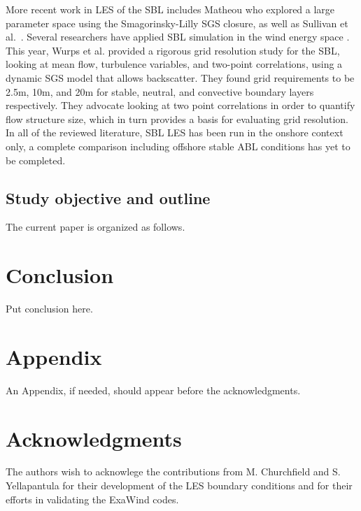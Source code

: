 \documentclass[conf]{new-aiaa}
\begin{document}
More recent work in LES of the SBL includes Matheou \cite{Matheou2016} who 
explored a large parameter space using the Smagorinsky-Lilly SGS 
closure, as well as Sullivan et al.\ \cite{sullivan2016turbulent}. Several researchers 
have applied SBL simulation in the wind energy space \cite{Aitken2014, Abkar2015, Ghaisas2017}. 
This year, Wurps et al. \cite{Wurps2020} provided a rigorous grid resolution study for the SBL, 
looking at mean flow, turbulence variables, and two-point correlations, using a dynamic 
SGS model that allows backscatter. They found grid requirements to be 2.5m, 10m, and 20m 
for stable, neutral, and convective boundary layers respectively. They advocate looking 
at two point correlations in order to quantify flow structure size, which in turn 
provides a basis for evaluating grid resolution. In all of the reviewed literature, SBL LES 
has been run in the onshore context only, a complete comparison
including offshore stable ABL conditions has yet to be completed.



\subsection{Study objective and outline}

The current paper is organized as follows.





\section{Conclusion}
Put conclusion here.

\section*{Appendix}

An Appendix, if needed, should appear before the acknowledgments.

\section*{Acknowledgments}

The authors wish to acknowlege the contributions from M. Churchfield
and S. Yellapantula for their development of the LES boundary
conditions and for their efforts in validating the ExaWind codes.
\end{document}

